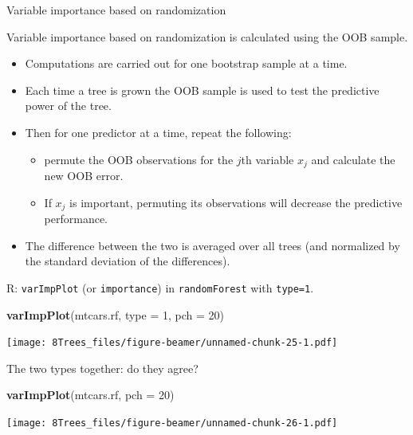 \documentclass[10pt,ignorenonframetext,]{beamer}
\newenvironment{Shaded}{\begin{snugshade}}{\end{snugshade}}
\newcommand{\KeywordTok}[1]{\textcolor[rgb]{0.13,0.29,0.53}{\textbf{#1}}}
\newcommand{\DataTypeTok}[1]{\textcolor[rgb]{0.13,0.29,0.53}{#1}}
\newcommand{\DecValTok}[1]{\textcolor[rgb]{0.00,0.00,0.81}{#1}}
\newcommand{\NormalTok}[1]{#1}
\providecommand{\tightlist}{%
  \setlength{\itemsep}{0pt}\setlength{\parskip}{0pt}}
\begin{document}
\begin{frame}[fragile]

\begin{block}{Variable importance based on randomization}

Variable importance based on randomization is calculated using the OOB
sample.

\begin{itemize}
\tightlist
\item
  Computations are carried out for one bootstrap sample at a time.
\item
  Each time a tree is grown the OOB sample is used to test the
  predictive power of the tree.
\item
  Then for one predictor at a time, repeat the following:

  \begin{itemize}
  \tightlist
  \item
    permute the OOB observations for the \(j\)th variable \(x_j\) and
    calculate the new OOB error.
  \item
    If \(x_j\) is important, permuting its observations will decrease
    the predictive performance.
  \end{itemize}
\item
  The difference between the two is averaged over all trees (and
  normalized by the standard deviation of the differences).
\end{itemize}

R: \texttt{varImpPlot} (or \texttt{importance}) in \texttt{randomForest}
with \texttt{type=1}.

\end{block}

\end{frame}

\begin{frame}[fragile]

\begin{Shaded}
\begin{Highlighting}[]
\KeywordTok{varImpPlot}\NormalTok{(mtcars.rf, }\DataTypeTok{type =} \DecValTok{1}\NormalTok{, }\DataTypeTok{pch =} \DecValTok{20}\NormalTok{)}
\end{Highlighting}
\end{Shaded}

\texttt{[image: 8Trees\_files/figure-beamer/unnamed-chunk-25-1.pdf]}

\end{frame}

\begin{frame}[fragile]

The two types together: do they agree?

\begin{Shaded}
\begin{Highlighting}[]
\KeywordTok{varImpPlot}\NormalTok{(mtcars.rf, }\DataTypeTok{pch =} \DecValTok{20}\NormalTok{)}
\end{Highlighting}
\end{Shaded}

\texttt{[image: 8Trees\_files/figure-beamer/unnamed-chunk-26-1.pdf]}

\end{frame}
\end{document}
